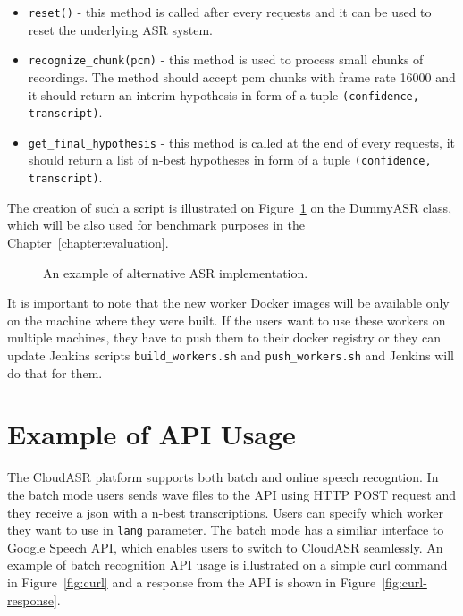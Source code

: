 \begin{itemize}
  \item
    \texttt{reset()} - this method is called after every requests
      and it can be used to reset the underlying ASR system.

  \item
    \texttt{recognize\_chunk(pcm)} - this method is used to process small chunks of recordings.
      The method should accept pcm chunks with frame rate 16000
        and it should return an interim hypothesis in form of a tuple \texttt{(confidence, transcript)}.

  \item
    \texttt{get\_final\_hypothesis} - this method is called at the end of every requests,
      it should return a list of n-best hypotheses in form of a tuple \texttt{(confidence, transcript)}.

\end{itemize}

The creation of such a script is illustrated on Figure~\ref{fig:dummyasr} on the DummyASR class,
  which will be also used for benchmark purposes in the Chapter~\ref{chapter:evaluation}.

\begin{figure}[h]
  

  \caption{An example of alternative ASR implementation.}
  \label{fig:dummyasr}
\end{figure}


It is important to note that the new worker Docker images will be available only on the machine
  where they were built.
If the users want to use these workers on multiple machines, they have to push them to their docker registry
  or they can update Jenkins scripts \texttt{build\_workers.sh} and \texttt{push\_workers.sh}
  and Jenkins will do that for them.


\section{Example of API Usage}
The CloudASR platform supports both batch and online speech recogntion.
In the batch mode users sends wave files to the API using HTTP POST request
  and they receive a json with a n-best transcriptions.
Users can specify which worker they want to use in \texttt{lang} parameter.
The batch mode has a similiar interface to Google Speech API,
  which enables users to switch to CloudASR seamlessly.
An example of batch recognition API usage is illustrated on a simple curl command in Figure~\ref{fig:curl}
  and a response from the API is shown in Figure~\ref{fig:curl-response}.

